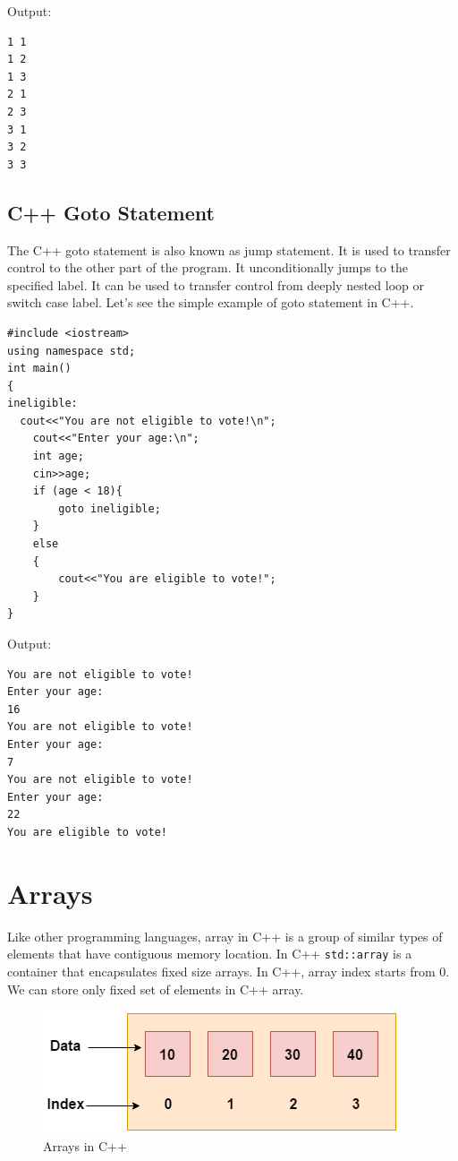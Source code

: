 \documentclass{book}
\begin{document}
Output:

\begin{lstlisting}
1 1
1 2
1 3
2 1
2 3
3 1
3 2
3 3
\end{lstlisting}

\subsection{C++ Goto Statement}

The C++ goto statement is also known as jump statement. It is used to transfer control to the other part of the program. It unconditionally jumps to the specified label. It can be used to transfer control from deeply nested loop or switch case label. Let's see the simple example of goto statement in C++.

\begin{lstlisting}
#include <iostream>  
using namespace std;  
int main()  
{  
ineligible:    
  cout<<"You are not eligible to vote!\n";    
	cout<<"Enter your age:\n";    
	int age;  
	cin>>age;  
	if (age < 18){    
		goto ineligible;    
	}    
	else    
	{    
		cout<<"You are eligible to vote!";     
	}         
}  
\end{lstlisting}

Output:

\begin{lstlisting}
You are not eligible to vote!
Enter your age:
16
You are not eligible to vote!
Enter your age:
7
You are not eligible to vote!
Enter your age:
22
You are eligible to vote!
\end{lstlisting}

\section{Arrays}

Like other programming languages, array in C++ is a group of similar types of elements that have contiguous memory location. In C++ \texttt{std::array} is a container that encapsulates fixed size arrays. In C++, array index starts from 0. We can store only fixed set of elements in C++ array.

\begin{figure}[h]
\includegraphics[width=\columnwidth]{c-array}%
\caption{Arrays in C++}%
\label{}%
\end{figure}
\end{document}

